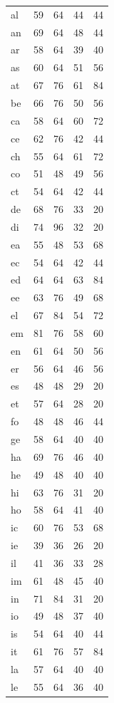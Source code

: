 \documentclass[ms,electronic,twosidetoc,letterpaper,chaptercenter,parttop,lof,lot]{byumsphd}
\begin{document}
\begin{table}
\begin{tabular}{| l | c c | c c |}
  al & 59 & 64 & 44 & 44 \\
  an & 69 & 64 & 48 & 44 \\
  ar & 58 & 64 & 39 & 40 \\
  as & 60 & 64 & 51 & 56 \\
  at & 67 & 76 & 61 & 84 \\
  be & 66 & 76 & 50 & 56 \\
  ca & 58 & 64 & 60 & 72 \\
  ce & 62 & 76 & 42 & 44 \\
  ch & 55 & 64 & 61 & 72 \\
  co & 51 & 48 & 49 & 56 \\
  ct & 54 & 64 & 42 & 44 \\
  de & 68 & 76 & 33 & 20 \\
  di & 74 & 96 & 32 & 20 \\
  ea & 55 & 48 & 53 & 68 \\
  ec & 54 & 64 & 42 & 44 \\
  ed & 64 & 64 & 63 & 84 \\
  ee & 63 & 76 & 49 & 68 \\
  el & 67 & 84 & 54 & 72 \\
  em & 81 & 76 & 58 & 60 \\
  en & 61 & 64 & 50 & 56 \\
  er & 56 & 64 & 46 & 56 \\
  es & 48 & 48 & 29 & 20 \\
  et & 57 & 64 & 28 & 20 \\
  fo & 48 & 48 & 46 & 44 \\
  ge & 58 & 64 & 40 & 40 \\
  ha & 69 & 76 & 46 & 40 \\
  he & 49 & 48 & 40 & 40 \\
  hi & 63 & 76 & 31 & 20 \\
  ho & 58 & 64 & 41 & 40 \\
  ic & 60 & 76 & 53 & 68 \\
  ie & 39 & 36 & 26 & 20 \\
  il & 41 & 36 & 33 & 28 \\
  im & 61 & 48 & 45 & 40 \\
  in & 71 & 84 & 31 & 20 \\
  io & 49 & 48 & 37 & 40 \\
  is & 54 & 64 & 40 & 44 \\
  it & 61 & 76 & 57 & 84 \\
  la & 57 & 64 & 40 & 40 \\
  le & 55 & 64 & 36 & 40 \\

\end{tabular}
\end{table}
\end{document}
